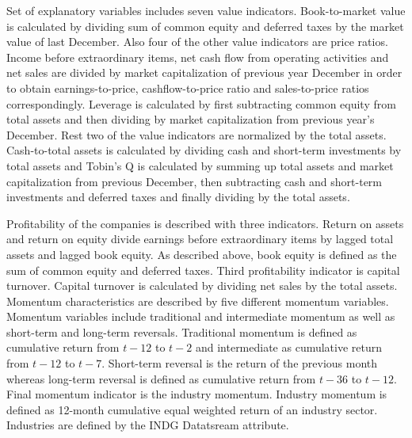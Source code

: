 \documentclass[12pt]{article}
\begin{document}
Set of explanatory variables includes seven value indicators. Book-to-market value is calculated by dividing sum of common equity and deferred taxes by the market value of last December. Also four of the other value indicators are price ratios. Income before extraordinary items, net cash flow from operating activities and net sales are divided by market capitalization of previous year December in order to obtain earnings-to-price, cashflow-to-price ratio and sales-to-price ratios correspondingly. Leverage is calculated by first subtracting common equity from total assets and then dividing by market capitalization from previous year's December. Rest two of the value indicators are normalized by the total assets. Cash-to-total assets is calculated by dividing cash and short-term investments by total assets and Tobin's Q is calculated by summing up total assets and market capitalization from previous December, then subtracting cash and short-term investments and deferred taxes and finally dividing by the total assets. \par

Profitability of the companies is described with three indicators. Return on assets and return on equity divide earnings before extraordinary items by lagged total assets and lagged book equity. As described above, book equity is defined as the sum of common equity and deferred taxes. Third profitability indicator is capital turnover. Capital turnover is calculated by dividing net sales by the total assets. Momentum characteristics are described by five different momentum variables. Momentum variables include traditional and intermediate momentum as well as short-term and long-term reversals. Traditional momentum is defined as cumulative return from $t-12$ to $t-2$ and intermediate as cumulative return from $t-12$ to $t-7$. Short-term reversal is the return of the previous month whereas long-term reversal is defined as cumulative return from $t-36$ to $t-12$. Final momentum indicator is the industry momentum. Industry momentum is defined as 12-month cumulative equal weighted return of an industry sector. Industries are defined by the INDG Datatsream attribute. \par
\end{document}
